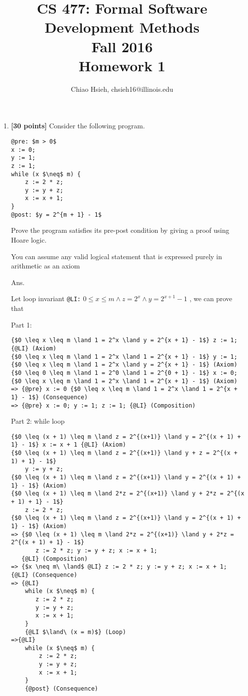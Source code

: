 \documentclass{article}
\title{\Large\bfseries CS 477: Formal Software Development Methods \\
Fall 2016 \\
Homework 1}
\author{Chiao Hsieh, chsieh16@illinois.edu}
\begin{document}
\maketitle

\begin{enumerate}
\item \textbf{[30 points]}
Consider the following program.
\begin{lstlisting}
@pre: $m > 0$
x := 0;
y := 1;
z := 1;
while (x $\neq$ m) {
    z := 2 * z;
    y := y + z;
    x := x + 1;
}
@post: $y = 2^{m + 1} - 1$
\end{lstlisting}

Prove the program satisfies its pre-post condition by giving a proof using
Hoare logic.

You can assume any valid logical statement that is expressed purely in
arithmetic as an axiom

\medskip
Ans.
\medskip

Let loop invariant \verb|@LI:| $0 \leq x \leq m \land z = 2^x \land y = 2^{x + 1} - 1$ ,
we can prove that

Part 1:
\begin{lstlisting}
{$0 \leq x \leq m \land 1 = 2^x \land y = 2^{x + 1} - 1$} z := 1; {@LI} (Axiom)
{$0 \leq x \leq m \land 1 = 2^x \land 1 = 2^{x + 1} - 1$} y := 1; {$0 \leq x \leq m \land 1 = 2^x \land y = 2^{x + 1} - 1$} (Axiom)
{$0 \leq 0 \leq m \land 1 = 2^0 \land 1 = 2^{0 + 1} - 1$} x := 0; {$0 \leq x \leq m \land 1 = 2^x \land 1 = 2^{x + 1} - 1$} (Axiom)
=> {@pre} x := 0 {$0 \leq x \leq m \land 1 = 2^x \land 1 = 2^{x + 1} - 1$} (Consequence)
=> {@pre} x := 0; y := 1; z := 1; {@LI} (Composition)
\end{lstlisting}

Part 2: while loop
\begin{lstlisting}
{$0 \leq (x + 1) \leq m \land z = 2^{(x+1)} \land y = 2^{(x + 1) + 1} - 1$} x := x + 1 {@LI} (Axiom)
{$0 \leq (x + 1) \leq m \land z = 2^{(x+1)} \land y + z = 2^{(x + 1) + 1} - 1$}
    y := y + z;
{$0 \leq (x + 1) \leq m \land z = 2^{(x+1)} \land y = 2^{(x + 1) + 1} - 1$} (Axiom)
{$0 \leq (x + 1) \leq m \land 2*z = 2^{(x+1)} \land y + 2*z = 2^{(x + 1) + 1} - 1$}
    z := 2 * z;
{$0 \leq (x + 1) \leq m \land z = 2^{(x+1)} \land y = 2^{(x + 1) + 1} - 1$} (Axiom)
=> {$0 \leq (x + 1) \leq m \land 2*z = 2^{(x+1)} \land y + 2*z = 2^{(x + 1) + 1} - 1$}
       z := 2 * z; y := y + z; x := x + 1;
   {@LI} (Composition)
=> {$x \neq m\ \land$ @LI} z := 2 * z; y := y + z; x := x + 1; {@LI} (Consequence)
=> {@LI} 
    while (x $\neq$ m) {
       z := 2 * z;
       y := y + z;
       x := x + 1;
    }
    {@LI $\land\ (x = m)$} (Loop)
=>{@LI} 
    while (x $\neq$ m) {
        z := 2 * z;
        y := y + z;
        x := x + 1;
    }
    {@post} (Consequence)
\end{lstlisting}


\end{enumerate}
\end{document}
